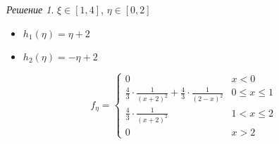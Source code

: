 \documentclass[english]{article}
\theoremstyle{plain}
\theoremstyle{remark}
\newtheorem*{solution}{Решение}
\theoremstyle{definition}
\begin{document}
\begin{solution}
\(\xi \in [1, 4]\), \(\eta \in [0, 2]\)
\begin{itemize}
\item \(h_1(\eta) = \eta + 2\)
\item \(h_2(\eta) = -\eta + 2\)
\end{itemize}
\[ f_\eta = \begin{cases}
0 & x < 0 \\
\frac{4}{3}\cdot\frac{1}{(x + 2)^2} + \frac{4}{3}\cdot\frac{1}{(2 - x)^2} & 0 \le x \le 1 \\
\frac{4}{3}\cdot\frac{1}{(x + 2)^2} & 1 < x \le 2 \\
0 & x > 2
\end{cases}\]
\end{solution}
\end{document}
